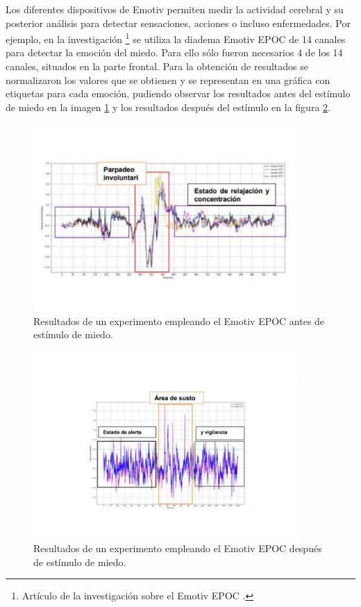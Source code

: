 Los diferentes dispositivos de Emotiv permiten medir la actividad cerebral y su posterior análisis para detectar sensaciones, acciones o incluso enfermedades. Por ejemplo, en la investigación \cite{ArticuloDiscusion1}\footnote{Artículo de la investigación sobre el Emotiv EPOC \cite{ArticuloDiscusion1}.} se utiliza la diadema Emotiv EPOC de 14 canales para detectar la emoción del miedo. Para ello sólo fueron necesarios 4 de los 14 canales, situados en la parte frontal. Para la obtención de resultados se normalizaron los valores que se obtienen y se representan en una gráfica con etiquetas para cada emoción, pudiendo observar los resultados antes del estímulo de miedo en la imagen \ref{fig: EEGReposoDiscusion1} y los resultados después del estímulo en la figura \ref{fig: EEGMiedoDiscusion1}.

\begin{figure}[h]
    \centering
    \includegraphics[width=0.9\textwidth]{img/EEGReposoDiscusion1.pdf}
    \caption{Resultados de un experimento empleando el Emotiv EPOC antes de estímulo de miedo.}
    \label{fig: EEGReposoDiscusion1}
    \end{figure}

\begin{figure}[h]
    \centering
    \includegraphics[width=0.9\textwidth]{img/EEGMiedoDiscusion1.pdf}
    \caption{Resultados de un experimento empleando el Emotiv EPOC después de estímulo de miedo.}
    \label{fig: EEGMiedoDiscusion1}
    \end{figure}


